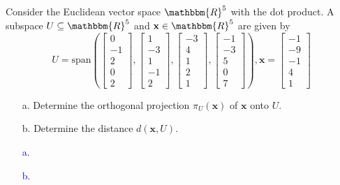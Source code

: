 \documentclass[a4paper,12pt]{article}
\newcommand{\R}{\mathbbm{R}}
\newcommand{\M}[1]{ \begin{bmatrix} #1 \end{bmatrix} }
\newcommand{\vecx}{\textbf{x}}
\begin{document}
\subsection{}
Consider the Euclidean vector space $\R^5$ with the dot product. A subspace $U \subseteq \R^5$ and $\vecx \in \R^5$ are given by
$$U = \textrm{span} \left( \M{0\\-1\\2\\0\\2}, 
                                         \M{1\\-3\\1\\-1\\2}, 
                                         \M{-3\\4\\1\\2\\1}, 
                                         \M{-1\\-3\\5\\0\\7} 
                                 \right), \vecx = 
                                         \M{-1\\-9\\-1\\4\\1}$$
\begin{itemize}
 \item [a.] Determine the orthogonal projection $\pi_U(\vecx)$ of $\vecx$ onto $U$.
 \item [b.] Determine the distance $d(\vecx,U)$.
\end{itemize}
\textcolor{blue}{
\begin{itemize}
 \item [a.] 
 \item [b.] 
\end{itemize}
}
\end{document}
